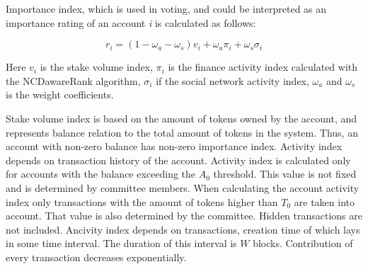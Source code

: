 \documentclass[a4paper,12pt]{article}
\begin{document}
Importance index, which is used in voting, and could be interpreted as an importance rating of an account \textit{i} is calculated as follows: 

$$
r_i = (1 - \omega_a - \omega_s) v_i + \omega_a \pi_i + \omega_s \sigma_i
$$

Here $v_i$ is the stake volume index, $\pi_i$ is the finance activity index calculated with the NCDawareRank algorithm, $\sigma_i$ if the social network activity index, $\omega_a$ and $\omega_s$ is the weight coefficients. 


Stake volume index is based on the amount of tokens owned by the account, and represents balance relation to the total amount of tokens in the system. Thus, an account with non-zero balance has non-zero importance index. Activity index depends on transaction history of the account. Activity index is calculated only for accounts with the balance exceeding the $A_0$ threshold. This value is not fixed and is determined by committee members. When calculating the account activity index only transactions with the amount of tokens higher than $T_0$ are taken into account. That value is also determined by the committee. Hidden transactions are not included. Ancivity index depends on transactions, creation time of which lays in some time interval. The duration of this interval is $W$ blocks. Contribution of every transaction decreases exponentially.

\end{document}
